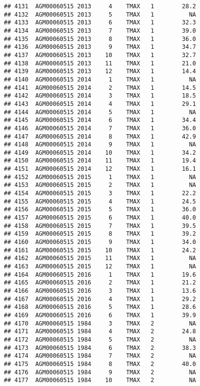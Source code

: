 \documentclass{article}\usepackage[]{graphicx}\usepackage[]{color}
\makeatletter
\newenvironment{kframe}{%
 \def\at@end@of@kframe{}%
 \ifinner\ifhmode%
  \def\at@end@of@kframe{\end{minipage}}%
  \begin{minipage}{\columnwidth}%
 \fi\fi%
 \def\FrameCommand##1{\hskip\@totalleftmargin \hskip-\fboxsep
 \colorbox{shadecolor}{##1}\hskip-\fboxsep
     \hskip-\linewidth \hskip-\@totalleftmargin \hskip\columnwidth}%
 \MakeFramed {\advance\hsize-\width
   \@totalleftmargin\z@ \linewidth\hsize
   \@setminipage}}%
 {\par\unskip\endMakeFramed%
 \at@end@of@kframe}
\newenvironment{knitrout}{}{} %
\makeatother
\begin{document}
\begin{knitrout}
\begin{kframe}
\begin{verbatim}
## 4131  AGM00060515 2013     4    TMAX   1        28.2
## 4132  AGM00060515 2013     5    TMAX   1          NA
## 4133  AGM00060515 2013     6    TMAX   1        32.3
## 4134  AGM00060515 2013     7    TMAX   1        39.0
## 4135  AGM00060515 2013     8    TMAX   1        36.0
## 4136  AGM00060515 2013     9    TMAX   1        34.7
## 4137  AGM00060515 2013    10    TMAX   1        32.7
## 4138  AGM00060515 2013    11    TMAX   1        21.0
## 4139  AGM00060515 2013    12    TMAX   1        14.4
## 4140  AGM00060515 2014     1    TMAX   1          NA
## 4141  AGM00060515 2014     2    TMAX   1        14.5
## 4142  AGM00060515 2014     3    TMAX   1        18.5
## 4143  AGM00060515 2014     4    TMAX   1        29.1
## 4144  AGM00060515 2014     5    TMAX   1          NA
## 4145  AGM00060515 2014     6    TMAX   1        34.4
## 4146  AGM00060515 2014     7    TMAX   1        36.0
## 4147  AGM00060515 2014     8    TMAX   1        42.9
## 4148  AGM00060515 2014     9    TMAX   1          NA
## 4149  AGM00060515 2014    10    TMAX   1        34.2
## 4150  AGM00060515 2014    11    TMAX   1        19.4
## 4151  AGM00060515 2014    12    TMAX   1        16.1
## 4152  AGM00060515 2015     1    TMAX   1          NA
## 4153  AGM00060515 2015     2    TMAX   1          NA
## 4154  AGM00060515 2015     3    TMAX   1        22.2
## 4155  AGM00060515 2015     4    TMAX   1        24.5
## 4156  AGM00060515 2015     5    TMAX   1        36.0
## 4157  AGM00060515 2015     6    TMAX   1        40.0
## 4158  AGM00060515 2015     7    TMAX   1        39.5
## 4159  AGM00060515 2015     8    TMAX   1        39.2
## 4160  AGM00060515 2015     9    TMAX   1        34.0
## 4161  AGM00060515 2015    10    TMAX   1        24.2
## 4162  AGM00060515 2015    11    TMAX   1          NA
## 4163  AGM00060515 2015    12    TMAX   1          NA
## 4164  AGM00060515 2016     1    TMAX   1        19.6
## 4165  AGM00060515 2016     2    TMAX   1        21.2
## 4166  AGM00060515 2016     3    TMAX   1        13.6
## 4167  AGM00060515 2016     4    TMAX   1        29.2
## 4168  AGM00060515 2016     5    TMAX   1        28.6
## 4169  AGM00060515 2016     6    TMAX   1        39.9
## 4170  AGM00060515 1984     3    TMAX   2          NA
## 4171  AGM00060515 1984     4    TMAX   2        24.8
## 4172  AGM00060515 1984     5    TMAX   2          NA
## 4173  AGM00060515 1984     6    TMAX   2        38.3
## 4174  AGM00060515 1984     7    TMAX   2          NA
## 4175  AGM00060515 1984     8    TMAX   2        40.0
## 4176  AGM00060515 1984     9    TMAX   2          NA
## 4177  AGM00060515 1984    10    TMAX   2          NA

\end{verbatim}
\end{kframe}
\end{knitrout}
\end{document}
